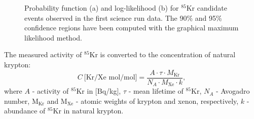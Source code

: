 \begin{figure}[!t]
\centering
{}
\caption[Probability function and log-likelihood for $^{85}$Kr candidate events observed in the first science run data]{Probability function (a) and log-likelihood (b) for $^{85}$Kr candidate events observed in the first science run data. The 90\% and 95\% confidence regions have been computed with the graphical maximum likelihood method.}
\label{figPDF}
\end{figure}

The measured activity of $^{85}$Kr is converted to the concentration of natural krypton:
\begin{equation}
C\ \text{[Kr/Xe mol/mol]} = \frac{A \cdot \tau \cdot M_{\mathrm{Kr}}}{N_{A} \cdot M_{\mathrm{Xe}} \cdot k},
\end{equation}
where $A$ - activity of $^{85}$Kr in [Bq/kg], $\tau$ - mean lifetime of $^{85}$Kr, $N_{A}$ - Avogadro number, M$_{\mathrm{Kr}}$ and M$_{\mathrm{Xe}}$ - atomic weights of krypton and xenon, respectively, $k$ - abundance of $^{85}$Kr in natural krypton.


